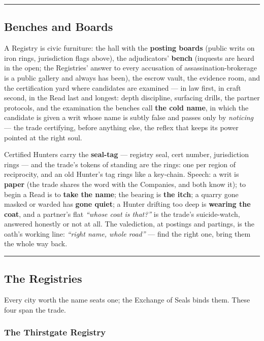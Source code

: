 \medskip\hrule\medskip

\subsection{Benches and Boards}

A Registry is civic furniture: the hall with the \textbf{posting boards} (public writs on iron rings, jurisdiction flags above), the adjudicators' \textbf{bench} (inquests are heard in the open; the Registries' answer to every accusation of assassination-brokerage is a public gallery and always has been), the escrow vault, the evidence room, and the certification yard where candidates are examined --- in law first, in craft second, in the Read last and longest: depth discipline, surfacing drills, the partner protocols, and the examination the benches call \textbf{the cold name}, in which the candidate is given a writ whose name is subtly false and passes only by \textit{noticing} --- the trade certifying, before anything else, the reflex that keeps its power pointed at the right soul.

Certified Hunters carry the \textbf{seal-tag} --- registry seal, cert number, jurisdiction rings --- and the trade's tokens of standing are the rings: one per region of reciprocity, and an old Hunter's tag rings like a key-chain. Speech: a writ is \textbf{paper} (the trade shares the word with the Companies, and both know it); to begin a Read is to \textbf{take the name}; the bearing is \textbf{the itch}; a quarry gone masked or warded has \textbf{gone quiet}; a Hunter drifting too deep is \textbf{wearing the coat}, and a partner's flat \textit{``whose coat is that?''} is the trade's suicide-watch, answered honestly or not at all. The valediction, at postings and partings, is the oath's working line: \textit{``right name, whole road''} --- find the right one, bring them the whole way back.

\medskip\hrule\medskip

\subsection{The Registries}

Every city worth the name seats one; the Exchange of Seals binds them. These four span the trade.

\subsubsection{The Thirstgate Registry}

